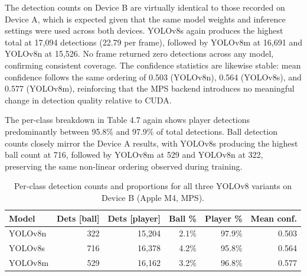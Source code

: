 \begin{table}[h]
\centering
\label{tab:inference_m4_summary}
\caption{Inference summary statistics for all three YOLOv8 variants on Device B (Apple M4, MPS).}
\end{table}

The detection counts on Device B are virtually identical to those recorded on Device A, which is expected given that the same model weights and inference settings were used across both devices. YOLOv8s again produces the highest total at 17,094 detections (22.79 per frame), followed by YOLOv8m at 16,691 and YOLOv8n at 15,526. No frame returned zero detections across any model, confirming consistent coverage. The confidence statistics are likewise stable: mean confidence follows the same ordering of 0.503 (YOLOv8n), 0.564 (YOLOv8s), and 0.577 (YOLOv8m), reinforcing that the MPS backend introduces no meaningful change in detection quality relative to CUDA.

The per-class breakdown in Table 4.7 again shows player detections predominantly between 95.8\% and 97.9\% of total detections. Ball detection counts closely mirror the Device A results, with YOLOv8s producing the highest ball count at 716, followed by YOLOv8m at 529 and YOLOv8n at 322, preserving the same non-linear ordering observed during training.

\begin{table}[H]
\centering
\label{tab:inference_m4_class}
\begin{tabular}{lrrrrr}
\toprule
\textbf{Model} & \textbf{Dets [ball]} & \textbf{Dets [player]} & \textbf{Ball \%} & \textbf{Player \%} & \textbf{Mean conf.} \\
\midrule
YOLOv8n & 322 & 15{,}204 & 2.1\% & 97.9\% & 0.503 \\
YOLOv8s & 716 & 16{,}378 & 4.2\% & 95.8\% & 0.564 \\
YOLOv8m & 529 & 16{,}162 & 3.2\% & 96.8\% & 0.577 \\
\bottomrule
\end{tabular}
\caption{Per-class detection counts and proportions for all three YOLOv8 variants on Device B (Apple M4, MPS).}
\end{table}

